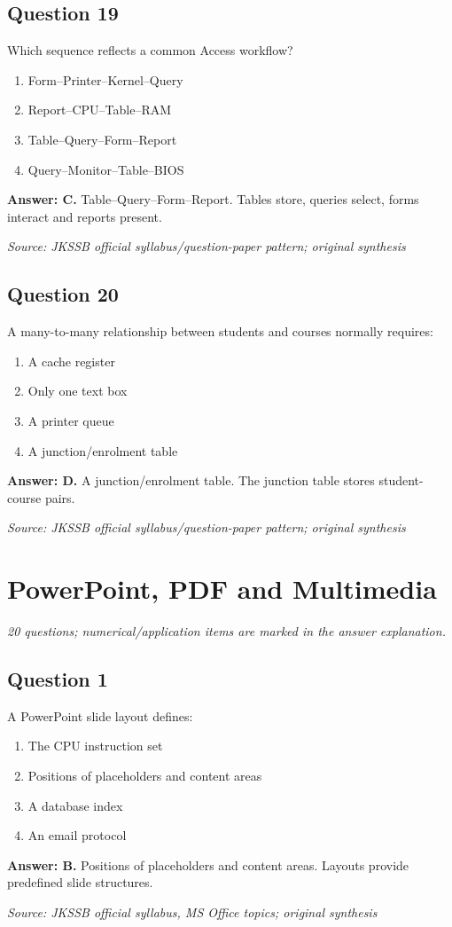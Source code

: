 \documentclass[11pt,a4paper]{book}
\newcommand{\source}[1]{\par\smallskip\textit{Source: #1}}
\newcommand{\answer}[2]{\par\textbf{Answer: #1.} #2}
\begin{document}
\section*{Question 19}
Which sequence reflects a common Access workflow?
\begin{enumerate}[label=\Alph*.]
\item Form–Printer–Kernel–Query
\item Report–CPU–Table–RAM
\item Table–Query–Form–Report
\item Query–Monitor–Table–BIOS
\end{enumerate}
\answer{C}{Table–Query–Form–Report. Tables store, queries select, forms interact and reports present.}
\source{JKSSB official syllabus/question-paper pattern; original synthesis}
\section*{Question 20}
A many-to-many relationship between students and courses normally requires:
\begin{enumerate}[label=\Alph*.]
\item A cache register
\item Only one text box
\item A printer queue
\item A junction/enrolment table
\end{enumerate}
\answer{D}{A junction/enrolment table. The junction table stores student-course pairs.}
\source{JKSSB official syllabus/question-paper pattern; original synthesis}

\chapter{PowerPoint, PDF and Multimedia}
\textit{20 questions; numerical/application items are marked in the answer explanation.}
\section*{Question 1}
A PowerPoint slide layout defines:
\begin{enumerate}[label=\Alph*.]
\item The CPU instruction set
\item Positions of placeholders and content areas
\item A database index
\item An email protocol
\end{enumerate}
\answer{B}{Positions of placeholders and content areas. Layouts provide predefined slide structures.}
\source{JKSSB official syllabus, MS Office topics; original synthesis}
\end{document}
